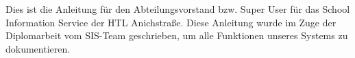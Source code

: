 Dies ist die Anleitung für den Abteilungsvorstand bzw. Super User für das School Information Service der HTL Anichstraße. Diese Anleitung wurde im Zuge der Diplomarbeit vom SIS-Team geschrieben, um alle Funktionen unseres Systems zu dokumentieren.